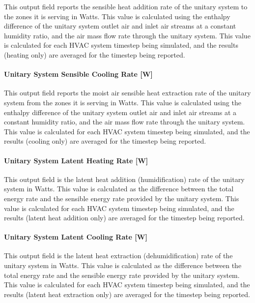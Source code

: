This output field reports the sensible heat addition rate of the unitary system to the zones it is serving in Watts. This value is calculated using the enthalpy difference of the unitary system outlet air and inlet air streams at a constant humidity ratio, and the air mass flow rate through the unitary system. This value is calculated for each HVAC system timestep being simulated, and the results (heating only) are averaged for the timestep being reported.

\paragraph{Unitary System Sensible Cooling Rate {[}W{]}}\label{unitary-system-sensible-cooling-rate-w}

This output field reports the moist air sensible heat extraction rate of the unitary system from the zones it is serving in Watts. This value is calculated using the enthalpy difference of the unitary system outlet air and inlet air streams at a constant humidity ratio, and the air mass flow rate through the unitary system. This value is calculated for each HVAC system timestep being simulated, and the results (cooling only) are averaged for the timestep being reported.

\paragraph{Unitary System Latent Heating Rate {[}W{]}}\label{unitary-system-latent-heating-rate-w}

This output field is the latent heat addition (humidification) rate of the unitary system in Watts. This value is calculated as the difference between the total energy rate and the sensible energy rate provided by the unitary system. This value is calculated for each HVAC system timestep being simulated, and the results (latent heat addition only) are averaged for the timestep being reported.

\paragraph{Unitary System Latent Cooling Rate {[}W{]}}\label{unitary-system-latent-cooling-rate-w}

This output field is the latent heat extraction (dehumidification) rate of the unitary system in Watts. This value is calculated as the difference between the total energy rate and the sensible energy rate provided by the unitary system. This value is calculated for each HVAC system timestep being simulated, and the results (latent heat extraction only) are averaged for the timestep being reported.

